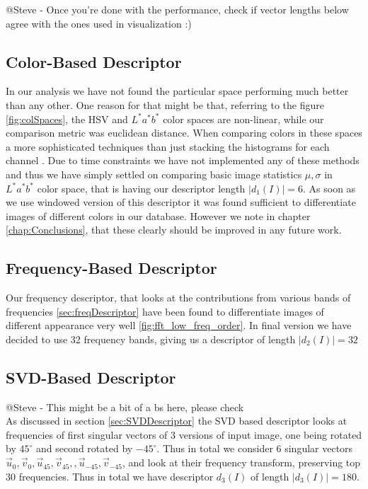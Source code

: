 \documentclass{report}
\begin{document}
{\color{red} @Steve - Once you're done with the performance, check if vector lengths below agree with the ones used in visualization :) }\\

\subsection{ Color-Based Descriptor }
In our analysis we have not found the particular space performing much better than any other. One reason for that might be that, referring to the figure \ref{fig:colSpaces}, the HSV and $L^*a^*b^*$ color spaces are non-linear, while our comparison metric was euclidean distance. When comparing colors in these spaces a more sophisticated techniques than just stacking the histograms for each channel \cite{lab_fuzzy_hist}. Due to time constraints we have not implemented any of these methods and thus we have simply settled on comparing basic image statistics $\mu, \sigma$ in  $L^*a^*b^*$ color space, that is having our descriptor length $|d_1(I)| = 6$. As soon as we use windowed version of this descriptor it was found sufficient to differentiate images of different colors in our database. However we note in chapter \ref{chap:Conclusions}, that these clearly should be improved in any future work.
\subsection{ Frequency-Based Descriptor }
Our frequency descriptor, that looks at the contributions from various bands of frequencies \ref{sec:freqDescriptor} have been found to differentiate images of different appearance very well \ref{fig:fft_low_freq_order}. In final version we have decided to use 32 frequency bands, giving us a descriptor of length $|d_2(I)| = 32$ 

\subsection{ SVD-Based Descriptor}
{\color{red} @Steve - This might be a bit of a bs here, please check }\\

As discussed in section \ref{sec:SVDDescriptor} the SVD based descriptor looks at frequencies of first singular vectors of 3 versions of input image, one being rotated by $45^\circ$ and second rotated by $-45^\circ$. Thus in total we consider 6 singular vectors $\vec{u}_0, \vec{v}_0, \vec{u}_{45}, \vec{v}_{45},, \vec{u}_{-45}, \vec{v}_{-45}$, and look at their frequency transform, preserving top 30 frequencies. Thus in total we have descriptor $d_3(I)$ of length $|d_3(I)| = 180$.
 
\end{document}
